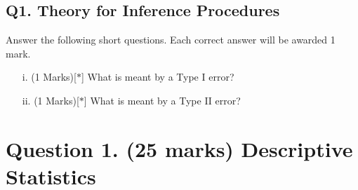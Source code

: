 \documentclass[a4paper,12pt]{article}
\begin{document}
\subsection*{Q1. Theory for Inference Procedures }
Answer the following short questions. Each correct answer will be awarded 1 mark.
\begin{itemize}
	\item[i.](1 Marks)[$\ast$] What is meant by a Type I error?
	\item[ii.](1 Marks)[$\ast$] What is meant by a Type II error?
\end{itemize}
%




\section*{Question 1. (25 marks) Descriptive Statistics}
\end{document}
